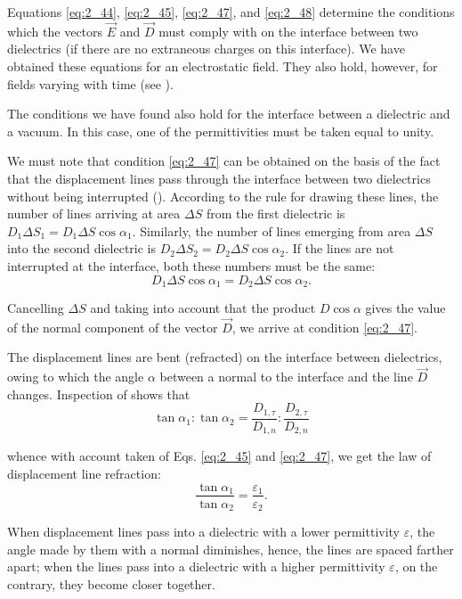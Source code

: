 Equations \eqref{eq:2_44}, \eqref{eq:2_45}, \eqref{eq:2_47}, and \eqref{eq:2_48} determine the conditions which the vectors $\vec{E}$ and $\vec{D}$ must comply with on the interface between two dielectrics (if there are no extraneous charges on this interface). We have obtained these equations for an electrostatic field. They also hold, however, for fields varying with time (see
).

The conditions we have found also hold for the interface between a dielectric and a vacuum. In this case, one of the permittivities must be taken equal to unity.

We must note that condition \eqref{eq:2_47} can be obtained on the basis of the fact that the displacement lines pass through the interface between two dielectrics without being interrupted (). According
to the rule for drawing these lines, the number of lines arriving at area $\Delta{S}$ from the first dielectric is $D_1\Delta{S}_1=D_1\Delta{S}\cos\alpha_1$. Similarly, the number of lines emerging from area $\Delta{S}$ into the second dielectric is $D_2\Delta{S}_2=D_2\Delta{S}\cos\alpha_2$. If the lines are not interrupted at the interface, both these numbers must be the same:
\begin{equation*}
    D_1\Delta{S}\cos\alpha_1 = D_2\Delta{S}\cos\alpha_2.
\end{equation*}

\noindent
Cancelling $\Delta{S}$ and taking into account that the product $D\cos\alpha$ gives the value of the normal component of the vector $\vec{D}$, we arrive at condition \eqref{eq:2_47}.

The displacement lines are bent (refracted) on the interface between dielectrics, owing to which the angle $\alpha$ between a normal to the interface and the line $\vec{D}$ changes. Inspection of  shows
that
\begin{equation*}
    \tan\alpha_1 : \tan\alpha_2 = \frac{D_{1,\tau}}{D_{1,n}} : \frac{D_{2,\tau}}{D_{2,n}}
\end{equation*}

\noindent
whence with account taken of Eqs. \eqref{eq:2_45} and \eqref{eq:2_47}, we get the law of displacement line refraction:
\begin{equation}\label{eq:2_49}
    \frac{\tan\alpha_1}{\tan\alpha_2} = \frac{\varepsilon_1}{\varepsilon_2}.
\end{equation}

\noindent
When displacement lines pass into a dielectric with a lower permittivity $\varepsilon$, the angle made by them with a normal diminishes, hence, the lines are spaced farther apart; when the lines pass into a dielectric with a higher permittivity $\varepsilon$, on the contrary, they become closer together.

